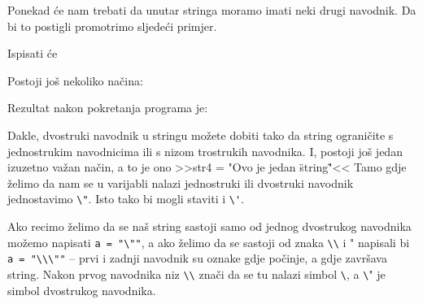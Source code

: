 	Ponekad \'{c}e nam trebati da unutar stringa moramo imati neki drugi navodnik. Da
	bi to postigli promotrimo sljede\'{c}i primjer.
	

	Ispisati \'{c}e


	Postoji jo\v{s} nekoliko na\v{c}ina:


	Rezultat nakon pokretanja programa je:


	Dakle, dvostruki navodnik u stringu mo\v{z}ete dobiti tako da string
	ograni\v{c}ite s jednostrukim navodnicima ili s nizom trostrukih navodnika. I,
	postoji jo\v{s} jedan izuzetno va\v{z}an na\v{c}in, a to je ono 
	>>str4 = "Ovo je jedan \"string\""<<
	Tamo gdje \v{z}elimo da nam se u varijabli nalazi jednostruki ili dvostruki
	navodnik jednostavimo \verb+\"+. Isto tako bi mogli staviti i \verb+\'+. 
	
	Ako recimo \v{z}elimo da se na\v{s} string sastoji samo od jednog dvostrukog
	navodnika mo\v{z}emo napisati \verb+a = "\""+, a ako \v{z}elimo da se sastoji od
	znaka \verb+\\+ i " napisali bi \verb+a = "\\\""+ -- prvi i zadnji navodnik su oznake gdje
	po\v{c}inje, a gdje zavr\v{s}ava string. Nakon prvog navodnika niz \verb+\\+ zna\v{c}i
	da se tu nalazi simbol \verb+\+, a \verb+\+" je simbol dvostrukog navodnika.
	
